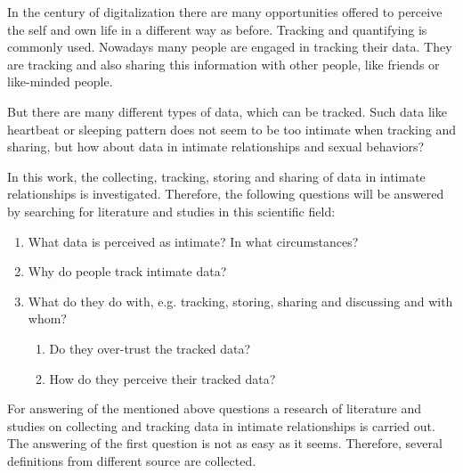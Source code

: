 
In the century of digitalization there are many opportunities offered to perceive the self and own life in a different way as before. Tracking and quantifying is commonly used. Nowadays many people are engaged in tracking their data. They are tracking and also sharing this information with other people, like friends or like-minded people. 



But there are many different types of data, which can be tracked. Such data like heartbeat or sleeping pattern does not seem to be too intimate when tracking and sharing, but how about data in intimate relationships and sexual behaviors? 


In this work, the collecting, tracking, storing and sharing of data in intimate relationships is investigated.
Therefore, the following questions will be answered by searching for  literature and studies in this scientific field:
 \begin{enumerate}
 	\item What data is perceived as intimate? In what circumstances?
 	\item Why do people track intimate data?
 	\item What do they do with, e.g. tracking, storing, sharing and discussing and with whom?
 	\begin{enumerate}
 		\item Do they over-trust the tracked data?
 		\item How do they perceive their tracked data?
 	\end{enumerate}
 \end{enumerate}
For answering of the mentioned above questions a research of literature and studies on collecting and tracking data in intimate relationships is carried out. The answering of the first question is not as easy as it seems. Therefore, several definitions from different source are collected.



